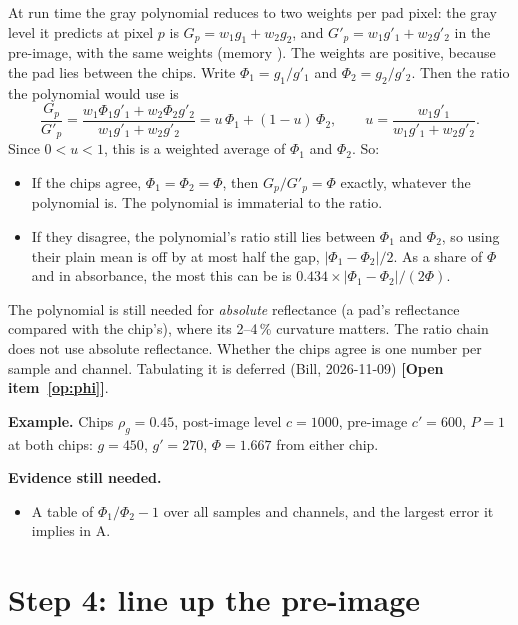 \documentclass[11pt,letter]{article}
\newcommand{\file}[1]{\texttt{\seqsplit{#1}}}
\newcommand{\open}[1]{\textbf{[Open item~\ref{#1}]}}
\newenvironment{evidence}{\par\medskip\noindent\textbf{Evidence still
needed.}\begin{itemize}[nosep]}{\end{itemize}\medskip}
\begin{document}
At run time the gray polynomial reduces to two weights per pad pixel: the
gray level it predicts at pixel $p$ is $G_p = w_1 g_1 + w_2 g_2$, and
$G'_p = w_1 g'_1 + w_2 g'_2$ in the pre-image, with the same weights
(memory \file{project\_flatfield\_anchor}).  The weights are positive,
because the pad lies between the chips.  Write $\Phi_1 = g_1/g'_1$ and
$\Phi_2 = g_2/g'_2$.  Then the ratio the polynomial would use is
\begin{equation}
  \frac{G_p}{G'_p}
  = \frac{w_1 \Phi_1 g'_1 + w_2 \Phi_2 g'_2}{w_1 g'_1 + w_2 g'_2}
  = u\,\Phi_1 + (1 - u)\,\Phi_2, \qquad
  u = \frac{w_1 g'_1}{w_1 g'_1 + w_2 g'_2} .
  \label{eq:polyratio}
\end{equation}
Since $0 < u < 1$, this is a weighted average of $\Phi_1$ and $\Phi_2$.  So:
\begin{itemize}[nosep]
  \item If the chips agree, $\Phi_1 = \Phi_2 = \Phi$, then
    $G_p/G'_p = \Phi$ exactly, whatever the polynomial is.  The polynomial
    is immaterial to the ratio.
  \item If they disagree, the polynomial's ratio still lies between
    $\Phi_1$ and $\Phi_2$, so using their plain mean is off by at most half
    the gap, $|\Phi_1 - \Phi_2|/2$.  As a share of $\Phi$ and in absorbance,
    the most this can be is $0.434 \times |\Phi_1 - \Phi_2| / (2\Phi)$.
\end{itemize}
The polynomial is still needed for \emph{absolute} reflectance (a pad's
reflectance compared with the chip's), where its 2--4\,\% curvature
matters.  The ratio chain does not use absolute reflectance.  Whether the
chips agree is one number per sample and channel.  Tabulating it is
deferred (Bill, 2026-11-09) \open{op:phi}.

\textbf{Example.}  Chips $\rho_g = 0.45$, post-image level $c = 1000$,
pre-image $c' = 600$, $P = 1$ at both chips: $g = 450$, $g' = 270$,
$\Phi = 1.667$ from either chip.

\begin{evidence}
  \item A table of $\Phi_1/\Phi_2 - 1$ over all samples and channels, and
    the largest error it implies in A.
\end{evidence}

\section{Step 4: line up the pre-image}
\label{sec:lineup}
\end{document}
